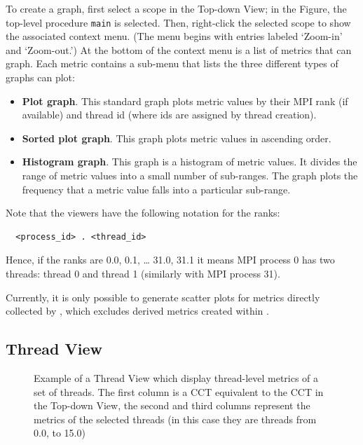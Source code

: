 To create a graph, first select a scope in the Top-down View; in the Figure, the top-level procedure \texttt{main} is selected.
Then, right-click the selected scope to show the associated context menu.
(The menu begins with entries labeled `Zoom-in' and `Zoom-out.')
At the bottom of the context menu is a list of metrics that \hpcviewer{} can graph.
Each metric contains a sub-menu that lists the three different types of graphs \hpcviewer{} can plot:
\begin{itemize}
\item \textbf{Plot graph}.
  This standard graph plots metric values by their MPI rank (if available) and thread id (where ids are assigned by thread creation).

\item \textbf{Sorted plot graph}.
  This graph plots metric values in ascending order.

\item \textbf{Histogram graph}.
  This graph is a histogram of metric values.
  It divides the range of metric values into a small number of sub-ranges.
  The graph plots the frequency that a metric value falls into a particular sub-range.
\end{itemize}

Note that the viewers have the following notation for the ranks:
\begin{verbatim}
  <process_id> . <thread_id>
\end{verbatim}
Hence, if the ranks are 0.0, 0.1, \dots{} 31.0, 31.1 it means MPI process 0 has two threads: thread 0 and thread 1 (similarly with MPI process 31). 


Currently, it is only possible to generate scatter plots for metrics directly collected by \hpcrun{}, which excludes derived metrics created within \hpcviewer{}.


\subsection{Thread View}
\label{sec:thread-level-table}

\begin{figure}[t]
\caption{Example of a Thread View which display thread-level metrics of a set of threads. The first column is a CCT equivalent to the CCT in the Top-down View, the second and third columns represent the metrics of the selected threads (in this case they are threads from 0.0, to 15.0)}
\label{fig:hpcviewer-view-thread-level}
\end{figure}

